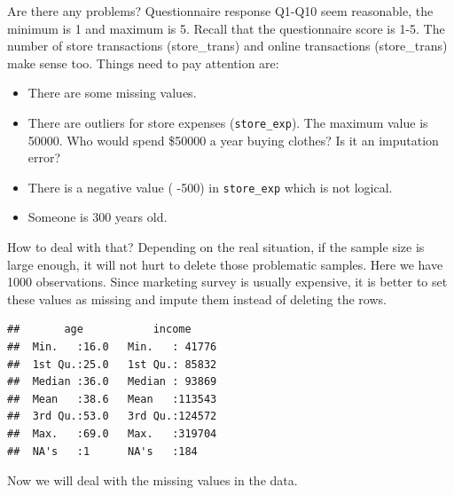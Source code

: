 \documentclass[12pt,]{krantz}
\newenvironment{Shaded}{\begin{snugshade}}{\end{snugshade}}
\newcommand{\KeywordTok}[1]{\textcolor[rgb]{0.13,0.29,0.53}{\textbf{{#1}}}}
\newcommand{\DataTypeTok}[1]{\textcolor[rgb]{0.13,0.29,0.53}{{#1}}}
\newcommand{\DecValTok}[1]{\textcolor[rgb]{0.00,0.00,0.81}{{#1}}}
\newcommand{\StringTok}[1]{\textcolor[rgb]{0.31,0.60,0.02}{{#1}}}
\newcommand{\CommentTok}[1]{\textcolor[rgb]{0.56,0.35,0.01}{\textit{{#1}}}}
\newcommand{\OtherTok}[1]{\textcolor[rgb]{0.56,0.35,0.01}{{#1}}}
\newcommand{\NormalTok}[1]{{#1}}
\providecommand{\tightlist}{%
  \setlength{\itemsep}{0pt}\setlength{\parskip}{0pt}}
\theoremstyle{definition}
\theoremstyle{definition}
\theoremstyle{remark}
\begin{document}
Are there any problems? Questionnaire response Q1-Q10 seem reasonable,
the minimum is 1 and maximum is 5. Recall that the questionnaire score
is 1-5. The number of store transactions (store\_trans) and online
transactions (store\_trans) make sense too. Things need to pay attention
are:

\begin{itemize}
\tightlist
\item
  There are some missing values.
\item
  There are outliers for store expenses (\texttt{store\_exp}). The
  maximum value is 50000. Who would spend \$50000 a year buying clothes?
  Is it an imputation error?
\item
  There is a negative value ( -500) in \texttt{store\_exp} which is not
  logical.
\item
  Someone is 300 years old.
\end{itemize}

How to deal with that? Depending on the real situation, if the sample
size is large enough, it will not hurt to delete those problematic
samples. Here we have 1000 observations. Since marketing survey is
usually expensive, it is better to set these values as missing and
impute them instead of deleting the rows.

\begin{Shaded}
\end{Shaded}

\begin{verbatim}
##       age           income      
##  Min.   :16.0   Min.   : 41776  
##  1st Qu.:25.0   1st Qu.: 85832  
##  Median :36.0   Median : 93869  
##  Mean   :38.6   Mean   :113543  
##  3rd Qu.:53.0   3rd Qu.:124572  
##  Max.   :69.0   Max.   :319704  
##  NA's   :1      NA's   :184
\end{verbatim}

Now we will deal with the missing values in the data.
\end{document}
